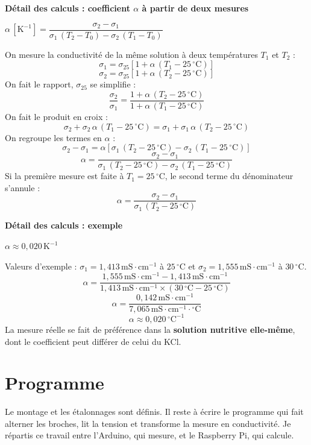 \documentclass[11pt,a4paper]{article}
\newcommand{\resultat}[1]{\begin{center}{\large\color{bleuENO}$\displaystyle #1$}\end{center}}
\newenvironment{demo}[2]{\par\medskip\noindent\textbf{Détail des calculs : #1}\par\nopagebreak\resultat{#2}}{\par\medskip}
\newcommand{\calcul}[2]{\par\medskip\noindent\textbf{Détail des calculs : #1}\par\nopagebreak\resultat{#2}}
\newcommand{\U}[1]{\,\mathrm{#1}}
\begin{document}
\begin{demo}{coefficient $\alpha$ à partir de deux mesures}{\alpha\,[\mathrm{K^{-1}}] = \dfrac{\sigma_2 - \sigma_1}{\sigma_1 \, (T_2 - T_0) - \sigma_2 \, (T_1 - T_0)}}
On mesure la conductivité de la même solution à deux températures $T_1$ et $T_2$ :
\[
\sigma_1 = \sigma_{25} \left[ 1 + \alpha \, (T_1 - 25\U{{}^{\circ}C}) \right]
\]
\[
\sigma_2 = \sigma_{25} \left[ 1 + \alpha \, (T_2 - 25\U{{}^{\circ}C}) \right]
\]
On fait le rapport, $\sigma_{25}$ se simplifie :
\[
\frac{\sigma_2}{\sigma_1} = \frac{1 + \alpha \, (T_2 - 25\U{{}^{\circ}C})}{1 + \alpha \, (T_1 - 25\U{{}^{\circ}C})}
\]
On fait le produit en croix :
\[
\sigma_2 + \sigma_2 \, \alpha \, (T_1 - 25\U{{}^{\circ}C}) = \sigma_1 + \sigma_1 \, \alpha \, (T_2 - 25\U{{}^{\circ}C})
\]
On regroupe les termes en $\alpha$ :
\[
\sigma_2 - \sigma_1 = \alpha \left[ \sigma_1 \, (T_2 - 25\U{{}^{\circ}C}) - \sigma_2 \, (T_1 - 25\U{{}^{\circ}C}) \right]
\]
\[
\alpha = \frac{\sigma_2 - \sigma_1}{\sigma_1 \, (T_2 - 25\U{{}^{\circ}C}) - \sigma_2 \, (T_1 - 25\U{{}^{\circ}C})}
\]
Si la première mesure est faite à $T_1 = 25\U{{}^{\circ}C}$, le second terme du dénominateur s'annule :
\[
\alpha = \frac{\sigma_2 - \sigma_1}{\sigma_1 \, (T_2 - 25\U{{}^{\circ}C})}
\]
\end{demo}

\calcul{exemple}{\alpha \approx 0{,}020\,\mathrm{K^{-1}}}
Valeurs d'exemple : $\sigma_1 = 1{,}413\U{mS \cdot cm^{-1}}$ à $25\U{{}^{\circ}C}$ et $\sigma_2 = 1{,}555\U{mS \cdot cm^{-1}}$ à $30\U{{}^{\circ}C}$.
\[
\alpha = \frac{1{,}555\U{mS \cdot cm^{-1}} - 1{,}413\U{mS \cdot cm^{-1}}}{1{,}413\U{mS \cdot cm^{-1}} \times (30\U{{}^{\circ}C} - 25\U{{}^{\circ}C})}
\]
\[
\alpha = \frac{0{,}142\U{mS \cdot cm^{-1}}}{7{,}065\U{mS \cdot cm^{-1} \cdot {}^{\circ}C}}
\]
\[
\alpha \approx 0{,}020\U{{}^{\circ}C^{-1}}
\]
La mesure réelle se fait de préférence dans la \textbf{solution nutritive elle-même}, dont le coefficient peut différer de celui du KCl.

\newpage
\section{Programme}
\label{sec:programme}

Le montage et les étalonnages sont définis. Il reste à écrire le programme qui fait alterner les broches, lit la tension et transforme la mesure en conductivité. Je répartis ce travail entre l'Arduino, qui mesure, et le Raspberry Pi, qui calcule.
\end{document}
